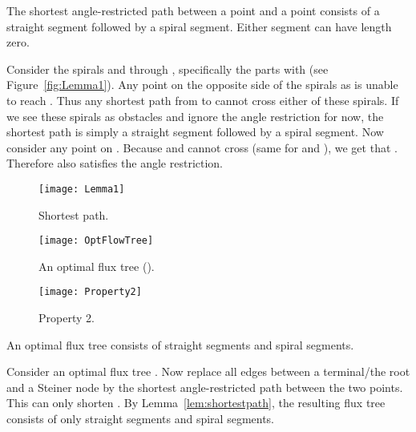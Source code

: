 \documentclass{journalA4}
\begin{document}
\begin{lemma}
\label{lem:shortestpath}
The shortest angle-restricted path between a point  and a point  consists of a straight segment followed by a spiral segment. Either segment can have length zero.
\end{lemma}
\medskip

Consider the spirals  and  through , specifically the parts with  (see Figure~\ref{fig:Lemma1}). Any point on the opposite side of the spirals as  is unable to reach . Thus any shortest path from  to  cannot cross either of these spirals. If we see these spirals as obstacles and ignore the angle restriction for now, the shortest path  is simply a straight segment followed by a spiral segment. Now consider any point  on . Because  and  cannot cross (same for  and ), we get that . Therefore  also satisfies the angle restriction.\hfill\QED

\begin{figure}[b]
    \hfill
    \begin{minipage}[t]{.25\textwidth}
        \centering
        \texttt{[image: Lemma1]}
        \small{\caption{Shortest path.\label{fig:Lemma1}}}
    \end{minipage}
    \hfill
    \begin{minipage}[t]{.45\textwidth}
        \centering
        \texttt{[image: OptFlowTree]}
        \small{\caption{An optimal flux tree ().\label{fig:OptFlowTree}}}
    \end{minipage}
    \hfill
    \begin{minipage}[t]{.25\textwidth}
        \centering
        \texttt{[image: Property2]}
        \small{\caption{Property 2.\label{fig:Property2}}}
    \end{minipage}
    \hfill\hfill
\end{figure}

\begin{property}
\label{property:optedgeshape}
An optimal flux tree consists of straight segments and spiral segments.
\end{property}
\medskip

Consider an optimal flux tree . Now replace all edges between a terminal/the root and a Steiner node by the shortest angle-restricted path between the two points. This can only shorten . By Lemma~\ref{lem:shortestpath}, the resulting flux tree consists of only straight segments and spiral segments. \hfill\QED
\end{document}
